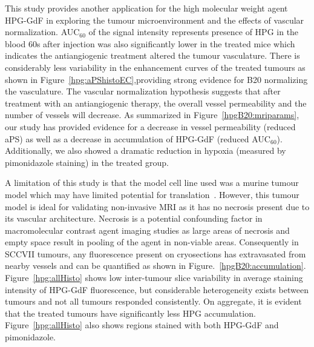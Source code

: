 This study provides another application for the high molecular weight agent \acs{HPG-GdF} in exploring the tumour microenvironment and the effects of vascular normalization.
\acs{AUC}$_{60}$ of the signal intensity represents presence of HPG in the blood 60s after injection was also significantly lower in the treated mice which indicates the antiangiogenic treatment altered the tumour vasculature.
There is considerably less variability in the enhancement curves of the treated tumours as shown in Figure~\ref{hpg:aPShistoEC},providing strong evidence for B20 normalizing the vasculature.
The vascular normalization hypothesis suggests that after treatment with an antiangiogenic therapy, the overall vessel permeability and the number of vessels will decrease.
As summarized in Figure~\ref{hpgB20:mriparams}, our study has provided evidence for a decrease in vessel permeability (reduced \acs{aPS}) as well as a decrease in accumulation of \acs{HPG-GdF} (reduced \acs{AUC}$_{60}$).
Additionally, we also showed a dramatic reduction in hypoxia (measured by pimonidazole staining) in the treated group. 

A limitation of this study is that the model cell line used was a murine tumour model which may have limited potential for translation~\cite{Mak:2014ux}.
However, this tumour model is ideal for validating non-invasive MRI as it has no necrosis present due to its vascular architecture.
Necrosis is a potential confounding factor in macromolecular contrast agent imaging studies as large areas of necrosis and empty space result in pooling of the agent in non-viable areas.
Consequently in SCCVII tumours, any fluorescence present on cryosections has extravasated from nearby vessels and can be quantified as shown in Figure.~\ref{hpgB20:accumulation}.
Figure~\ref{hpg:allHisto} shows low inter-tumour slice variability in average staining intensity of \acs{HPG-GdF} fluorescence, but considerable heterogeneity exists between tumours and not all tumours responded consistently.
On aggregate, it is evident that the treated tumours have significantly less HPG accumulation.
Figure~\ref{hpg:allHisto} also shows regions stained with both \acs{HPG-GdF} and pimonidazole.

